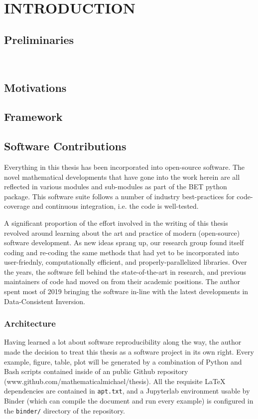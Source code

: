 \chapter{\uppercase{Introduction}} \label{chapter:01}

\section{Preliminaries}

\
\section{Motivations}


\section{Framework}




\section{Software Contributions}
Everything in this thesis has been incorporated into open-source software.
The novel mathematical developments that have gone into the work herein are all reflected in various modules and sub-modules as part of the BET python package.
This software suite follows a number of industry best-practices for code-coverage and continuous integration, i.e. the code is well-tested.

A significant proportion of the effort involved in the writing of this thesis revolved around learning about the art and practice of modern (open-source) software development.
As new ideas sprang up, our research group found itself coding and re-coding the same methods that had yet to be incorporated into user-friednly, computationally efficient, and properly-parallelized libraries.
Over the years, the software fell behind the state-of-the-art in research, and previous maintainers of code had moved on from their academic positions.
The author spent most of 2019 bringing the software in-line with the latest developments in Data-Consistent Inversion.

\subsection{Architecture}
Having learned a lot about software reproducibility along the way, the author made the decision to treat this thesis as a software project in its own right.
Every example, figure, table, plot will be generated by a combination of Python and Bash scripts contained inside of an public Github repository (www.github.com/mathematicalmichael/thesis).
All the requisite LaTeX dependencies are contained in {\tt apt.txt}, and a Jupyterlab environment usable by Binder (which can compile the document and run every example) is configured in the {\tt binder/} directory of the repository.

